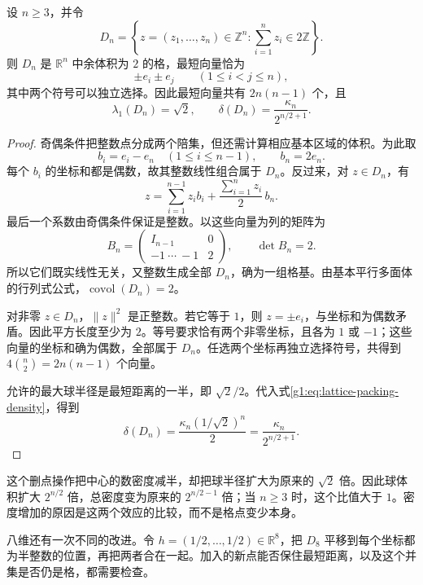 \begin{proposition}
	\label{g1:prop:dn-packing-density}
	设 \(n\ge3\)，并令
	\[
		D_n=\left\{z=(z_1,\ldots,z_n)\in\mathbb Z^n:
		\sum_{i=1}^n z_i\in2\mathbb Z\right\}.
	\]
	则 \(D_n\) 是 \(\mathbb R^n\) 中余体积为 \(2\) 的格，最短向量恰为
	\[
		\pm e_i\pm e_j\qquad(1\le i<j\le n),
	\]
	其中两个符号可以独立选择。因此最短向量共有 \(2n(n-1)\) 个，且
	\[
		\lambda_1(D_n)=\sqrt2,\qquad
		\delta(D_n)=\frac{\kappa_n}{2^{n/2+1}}.
	\]
\end{proposition}
\begin{proof}
	奇偶条件把整数点分成两个陪集，但还需计算相应基本区域的体积。为此取
	\[
		b_i=e_i-e_n\quad(1\le i\le n-1),\qquad b_n=2e_n.
	\]
	每个 \(b_i\) 的坐标和都是偶数，故其整数线性组合属于 \(D_n\)。反过来，对 \(z\in D_n\)，有
	\begin{equation}
		\label{g1:eq:dn-explicit-basis}
		z=\sum_{i=1}^{n-1}z_i b_i+
		\frac{\sum_{i=1}^n z_i}{2}\,b_n.
	\end{equation}
	最后一个系数由奇偶条件保证是整数。以这些向量为列的矩阵为
	\[
		B_n=
		\begin{pmatrix}
			I_{n-1}&0\\
			-1\ \cdots\ -1&2
		\end{pmatrix},\qquad \det B_n=2.
	\]
	所以它们既实线性无关，又整数生成全部 \(D_n\)，确为一组格基。由基本平行多面体的行列式公式，\(\operatorname{covol}(D_n)=2\)。

	对非零 \(z\in D_n\)，\(\lVert z\rVert^2\) 是正整数。若它等于 \(1\)，则 \(z=\pm e_i\)，与坐标和为偶数矛盾。因此平方长度至少为 \(2\)。等号要求恰有两个非零坐标，且各为 \(1\) 或 \(-1\)；这些向量的坐标和确为偶数，全部属于 \(D_n\)。任选两个坐标再独立选择符号，共得到 \(4\binom n2=2n(n-1)\) 个向量。

	允许的最大球半径是最短距离的一半，即 \(\sqrt2/2\)。代入式\eqref{g1:eq:lattice-packing-density}，得到
	\[
		\delta(D_n)
		=\frac{\kappa_n(1/\sqrt2)^n}{2}
		=\frac{\kappa_n}{2^{n/2+1}}.
	\]
\end{proof}

这个删点操作把中心的数密度减半，却把球半径扩大为原来的 \(\sqrt2\) 倍。因此球体积扩大 \(2^{n/2}\) 倍，总密度变为原来的 \(2^{n/2-1}\) 倍；当 \(n\ge3\) 时，这个比值大于 \(1\)。密度增加的原因是这两个效应的比较，而不是格点变少本身。

\ProseParagraphBreak

八维还有一次不同的改进。令 \(h=(1/2,\ldots,1/2)\in\mathbb R^8\)，把 \(D_8\) 平移到每个坐标都为半整数的位置，再把两者合在一起。加入的新点能否保住最短距离，以及这个并集是否仍是格，都需要检查。

